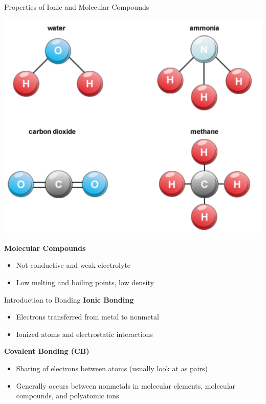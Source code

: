 \documentclass[11pt]{beamer}
\begin{document}
\begin{frame}{Properties of Ionic and Molecular Compounds}
  \begin{center}
    \includegraphics[width=0.6\linewidth]{molec_example}
  \end{center}
  \vspace{-0.3in}
  \textbf{Molecular Compounds}
  \begin{itemize}
  \item Not conductive and weak electrolyte
  \item Low melting and boiling points, low density
  \end{itemize}
\end{frame}


\begin{frame}{Introduction to Bonding}
  \textbf{Ionic Bonding}
  \begin{itemize}
  \item Electrons transferred from metal
    to nonmetal
  \item Ionized atoms and electrostatic interactions
  \end{itemize}

  \textbf{Covalent Bonding (CB)}
  \begin{itemize}
  \item Sharing of electrons between atoms (usually
    look at as pairs)
  \item Generally occurs between nonmetals in molecular
    elements, molecular compounds, and polyatomic ions
  \end{itemize}
\end{frame}
\end{document}

